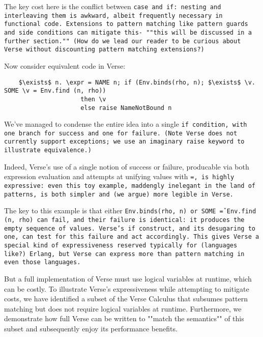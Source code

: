 \documentclass[]{article}
\begin{document}
\bigskip 

The key cost here is the conflict between \tt{case} and \tt{if}: nesting and 
interleaving them is awkward, albeit frequently necessary in functional code. 
Extensions to pattern matching like pattern guards and side conditions can 
mitigate this- ""this will be discussed in a further section."" (How do we lead 
our reader to be curious about Verse without discounting pattern matching 
extensions?)

\bigskip

Now consider equivalent code in Verse: 
\verselst

\begin{lstlisting}
    $\exists$ n. \expr = NAME n; if (Env.binds(rho, n); $\exists$ \v. SOME \v = Env.find (n, rho)) 
                     then \v
                     else raise NameNotBound n
\end{lstlisting}

\bigskip

We've managed to condense the entire idea into a single \tt{if} condition, 
with one branch for success and one for failure. (Note Verse does not currently
support exceptions; we use an imaginary \tt{raise} keyword to illustrate
equivalence.)

Indeed, Verse's use of a single notion of success or failure, producable via 
both expression evaluation and attempts at unifying values with \tt{=}, is 
highly expressive: even this toy example, maddengly inelegant in the land of 
patterns, is both simpler and (we argue) more legible in Verse. 

The key to this example is that either \tt{Env.binds(rho, n)}  or \tt{SOME \v =
Env.find (n, rho)} can fail, and their failure is identical: it produces the
empty sequence of values. Verse's \tt{if} construct, and its desugaring to
\tt{one}, can test for this failure and act accordingly. This gives Verse a 
special kind of expressiveness reserved typically for (languages like?) Erlang, 
but Verse can express more than pattern matching in even those languages. 




But a full implementation of Verse must use logical variables at runtime, which
can be costly. To illustrate Verse's expressiveness while attempting to mitigate
costs, we have identified a subset of the Verse Calculus that subsumes pattern
matching but does not require logical variables at runtime. Furthermore, we
demonstrate how full Verse can be written to ""match the semantics"" of this
subset and subsequently enjoy its performance benefits. 
\end{document}
